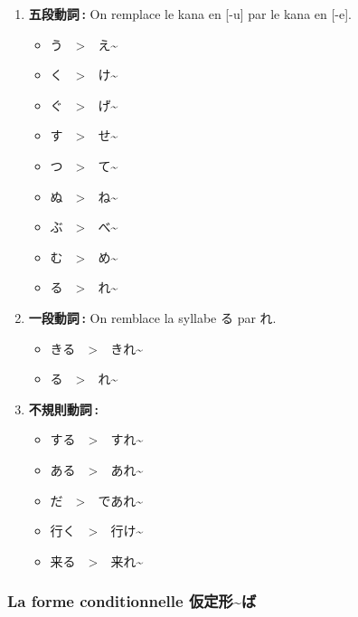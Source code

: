 \begin{enumerate}
    \item \textbf{五段動詞 :} On remplace le kana en [-u] par le kana en [-e].
          \begin{itemize}
              \item {}う　>　え\~{}
              \item {}く　>　け\~{}
              \item {}ぐ　>　げ\~{}
              \item {}す　>　せ\~{}
              \item {}つ　>　て\~{}
              \item {}ぬ　>　ね\~{}
              \item {}ぶ　>　べ\~{}
              \item {}む　>　め\~{}
              \item {}る　>　れ\~{}
          \end{itemize}
    \item \textbf{一段動詞 :} On remblace la syllabe る par れ.
          \begin{itemize}
              \item {}きる　>　きれ\~{}
              \item {}る　>　れ\~{}
          \end{itemize}
    \item \textbf{不規則動詞 :}
          \begin{itemize}
              \item する　>　すれ\~{}
              \item ある　>　あれ\~{}
              \item だ　>　であれ\~{}
              \item 行く　>　行け\~{}
              \item 来る　>　来れ\~{}
          \end{itemize}
\end{enumerate}

\subsubsection{La forme conditionnelle 仮定形\~{}ば}

